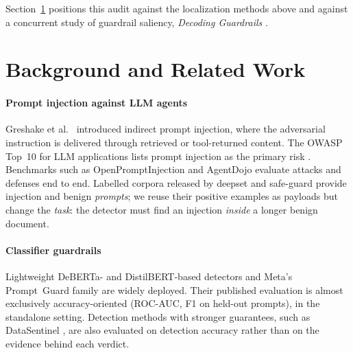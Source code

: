 \documentclass{ieeeaccess}
\begin{document}
Section~\ref{sec:related} positions this audit against the localization methods above and against a concurrent study of guardrail saliency, \emph{Decoding Guardrails} \cite{decodingguardrails}.

\section{Background and Related Work}
\label{sec:related}

\paragraph*{Prompt injection against LLM agents}
Greshake et al.\ \cite{greshake2023} introduced indirect prompt injection, where the adversarial instruction is delivered through retrieved or tool-returned content. The OWASP Top~10 for LLM applications lists prompt injection as the primary risk \cite{owaspllm}. Benchmarks such as OpenPromptInjection \cite{openpi2024} and AgentDojo \cite{agentdojo2024} evaluate attacks and defenses end to end. Labelled corpora released by deepset \cite{deepsetpi} and safe-guard \cite{safeguardpi} provide injection and benign \emph{prompts}; we reuse their positive examples as payloads but change the \emph{task}: the detector must find an injection \emph{inside} a longer benign document.

\paragraph*{Classifier guardrails}
Lightweight DeBERTa- and DistilBERT-based detectors \cite{protectai2024,deepsetpi,fmops} and Meta's Prompt~Guard family \cite{promptguard2024} are widely deployed. Their published evaluation is almost exclusively accuracy-oriented (ROC-AUC, F1 on held-out prompts), in the standalone setting. Detection methods with stronger guarantees, such as DataSentinel \cite{datasentinel2025}, are also evaluated on detection accuracy rather than on the evidence behind each verdict.
\end{document}
